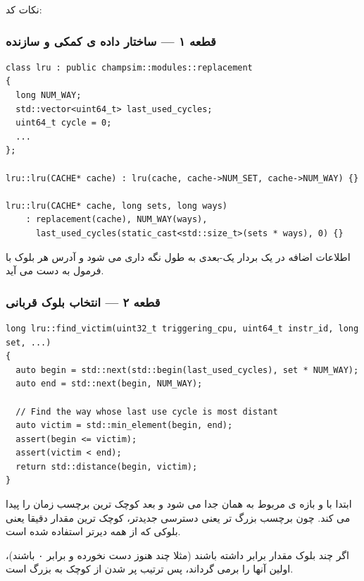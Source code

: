 \documentclass[12pt,a4paper]{article}
\begin{document}
نکات کد:

\subsubsection{قطعه ۱ — ساختار داده ی کمکی و سازنده}

\begin{latin}
\begin{lstlisting}
class lru : public champsim::modules::replacement
{
  long NUM_WAY;
  std::vector<uint64_t> last_used_cycles;
  uint64_t cycle = 0;
  ...
};

lru::lru(CACHE* cache) : lru(cache, cache->NUM_SET, cache->NUM_WAY) {}

lru::lru(CACHE* cache, long sets, long ways)
    : replacement(cache), NUM_WAY(ways),
      last_used_cycles(static_cast<std::size_t>(sets * ways), 0) {}
\end{lstlisting}
\end{latin}

اطلاعات اضافه در یک بردار یک-بعدی به طول  نگه داری می شود و آدرس هر بلوک با فرمول  به دست می آید.

\subsubsection{قطعه ۲ — انتخاب بلوک قربانی}

\begin{latin}
\begin{lstlisting}
long lru::find_victim(uint32_t triggering_cpu, uint64_t instr_id, long set, ...)
{
  auto begin = std::next(std::begin(last_used_cycles), set * NUM_WAY);
  auto end = std::next(begin, NUM_WAY);

  // Find the way whose last use cycle is most distant
  auto victim = std::min_element(begin, end);
  assert(begin <= victim);
  assert(victim < end);
  return std::distance(begin, victim);
}
\end{lstlisting}
\end{latin}

ابتدا با  و  بازه ی مربوط به همان  جدا می شود و بعد  کوچک ترین برچسب زمان را پیدا می کند. چون برچسب بزرگ تر یعنی دسترسی جدیدتر، کوچک ترین مقدار دقیقا یعنی بلوکی که از همه دیرتر استفاده شده است.

اگر چند بلوک مقدار برابر داشته باشند (مثلا چند  هنوز دست نخورده و برابر ۰ باشند)،  اولین آنها را برمی گرداند، پس ترتیب پر شدن  از  کوچک به بزرگ است.
\end{document}
